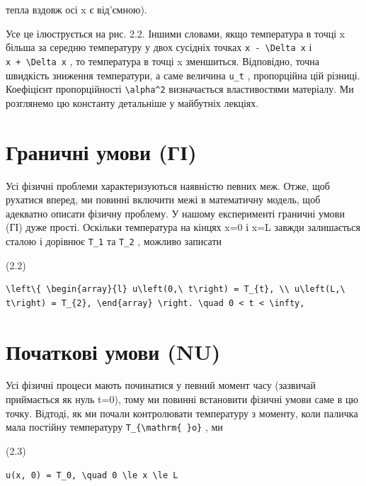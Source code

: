 \documentclass[
  ukrainian,
]{article}
\begin{document}
тепла вздовж осі x є від'ємною).

Усе це ілюструється на рис. 2.2. Іншими словами, якщо температура в
точці x більша за середню температуру у двох сусідніх точках
\texttt{x\ -\ \textbackslash{}Delta\ x} і
\texttt{x\ +\ \textbackslash{}Delta\ x} , то температура в точці x
зменшиться. Відповідно, точна швидкість зниження температури, а саме
величина \texttt{u\_t} , пропорційна цій різниці. Коефіцієнт
пропорційності \texttt{\textbackslash{}alpha\^{}2} визначається
властивостями матеріалу. Ми розглянемо цю константу детальніше у
майбутніх лекціях.

\section{Граничні умови
(ГІ)}\label{ux433ux440ux430ux43dux438ux447ux43dux456-ux443ux43cux43eux432ux438-ux433ux456}

Усі фізичні проблеми характеризуються наявністю певних меж. Отже, щоб
рухатися вперед, ми повинні включити межі в математичну модель, щоб
адекватно описати фізичну проблему. У нашому експерименті граничні умови
(ГІ) дуже прості. Оскільки температура на кінцях x=0 і x=L завжди
залишається сталою і дорівнює \texttt{T\_1} та \texttt{T\_2} , можливо
записати

(2.2)

\begin{verbatim}
\left\{ \begin{array}{l} u\left(0,\ t\right) = T_{t}, \\ u\left(L,\ t\right) = T_{2}, \end{array} \right. \quad 0 < t < \infty,
\end{verbatim}

\section{Початкові умови
(NU)}\label{ux43fux43eux447ux430ux442ux43aux43eux432ux456-ux443ux43cux43eux432ux438-nu}

Усі фізичні процеси мають починатися у певний момент часу (зазвичай
приймається як нуль t=0), тому ми повинні встановити фізичні умови саме
в цю точку. Відтоді, як ми почали контролювати температуру з моменту,
коли паличка мала постійну температуру
\texttt{T\_\{\textbackslash{}mathrm\{\ \}o\}} , ми

(2.3)

\begin{verbatim}
u(x, 0) = T_0, \quad 0 \le x \le L
\end{verbatim}
\end{document}
